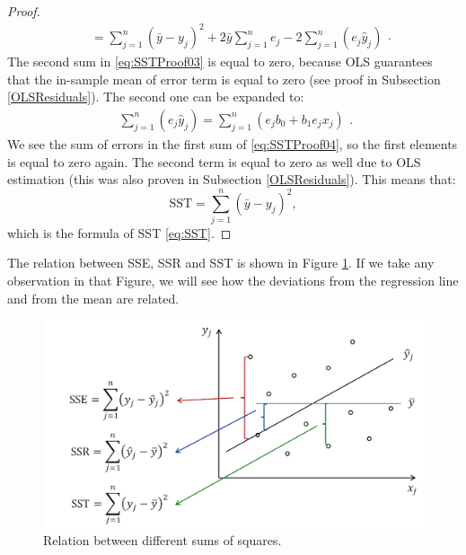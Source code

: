 \documentclass[
]{book}
\theoremstyle{definition}
\theoremstyle{definition}
\theoremstyle{definition}
\theoremstyle{definition}
\theoremstyle{remark}
\begin{document}
\begin{proof}
\begin{equation}
\begin{aligned}
        &= \sum_{j=1}^n (\bar{y} - y_j)^2 + 2 \bar{y} \sum_{j=1}^n e_j - 2 \sum_{j=1}^n \left(e_j \hat{y}_j \right)
    \end{aligned} .
    \label{eq:SSTProof03}
\end{equation}
The second sum in \eqref{eq:SSTProof03} is equal to zero, because OLS guarantees that the in-sample mean of error term is equal to zero (see proof in Subsection \ref{OLSResiduals}). The second one can be expanded to:
\begin{equation}
    \begin{aligned}
        \sum_{j=1}^n \left(e_j \hat{y}_j \right) = \sum_{j=1}^n \left(e_j b_0 + b_1 e_j x_j \right)
    \end{aligned} .
    \label{eq:SSTProof04}
\end{equation}
We see the sum of errors in the first sum of \eqref{eq:SSTProof04}, so the first elements is equal to zero again. The second term is equal to zero as well due to OLS estimation (this was also proven in Subsection \ref{OLSResiduals}). This means that:
\begin{equation}
    \mathrm{SST} =  \sum_{j=1}^n (\bar{y} - y_j)^2 ,
    \label{eq:SSTProof05}
\end{equation}
which is the formula of SST \eqref{eq:SST}.
\end{proof}

The relation between SSE, SSR and SST is shown in Figure \ref{fig:sumsSquaredRelation}. If we take any observation in that Figure, we will see how the deviations from the regression line and from the mean are related.

\begin{figure}
\centering
\includegraphics{images/09-SLR-SSE-white.png}
\caption{\label{fig:sumsSquaredRelation}Relation between different sums of squares.}
\end{figure}
\end{document}
